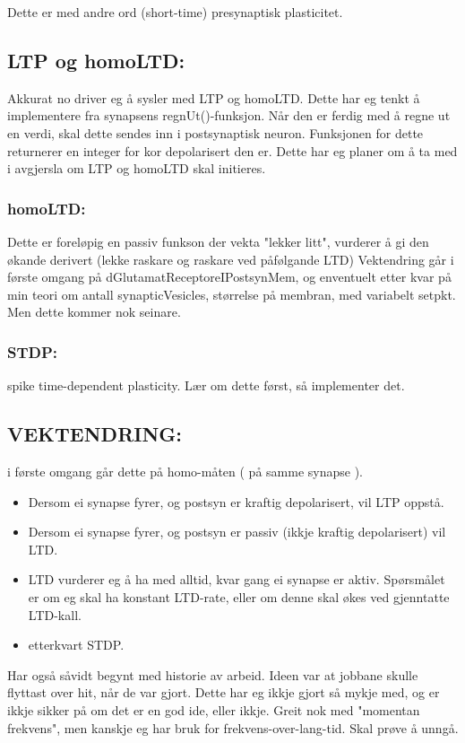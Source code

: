 \documentclass[norsk,9 pt]{report}
\begin{document}
	Dette er med andre ord (short-time) presynaptisk plasticitet.


	\subsection{LTP og homoLTD:}
	Akkurat no driver eg å sysler med LTP og homoLTD. Dette har eg tenkt å implementere fra synapsens regnUt()-funksjon. Når den er ferdig med å regne ut
	en verdi, skal dette sendes inn i postsynaptisk neuron. Funksjonen for dette returnerer en integer for kor depolarisert den er. Dette har eg planer 
	om å ta med i avgjersla om LTP og homoLTD skal initieres. 
		\subsubsection{homoLTD:}
		Dette er foreløpig en passiv funkson der vekta "lekker litt", vurderer å gi den økande derivert (lekke raskare og raskare ved påfølgande LTD)
		Vektendring går i første omgang på dGlutamatReceptoreIPostsynMem, og enventuelt etter kvar på min teori om 
		antall synapticVesicles, størrelse på membran, med variabelt setpkt. Men dette kommer nok seinare.
		\subsubsection{STDP:}
		spike time-dependent plasticity. Lær om dette først, så implementer det.

	\subsection{VEKTENDRING:}
		i første omgang går dette på homo-måten ( på samme synapse ). 
		\begin{itemize}
			\item Dersom ei synapse fyrer, og postsyn er kraftig depolarisert, vil LTP oppstå.
			\item Dersom ei synapse fyrer, og postsyn er passiv (ikkje kraftig depolarisert) vil LTD.
			\item LTD vurderer eg å ha med alltid, kvar gang ei synapse er aktiv. Spørsmålet er om eg skal ha konstant LTD-rate, eller om denne skal
			økes ved gjenntatte LTD-kall.

			\item etterkvart STDP.
		\end{itemize}



Har også såvidt begynt med historie av arbeid. Ideen var at jobbane skulle flyttast over hit, når de var gjort. Dette har eg ikkje gjort så mykje med, og er 
ikkje sikker på om det er en god ide, eller ikkje. Greit nok med "momentan frekvens", men kanskje eg har bruk for frekvens-over-lang-tid. Skal prøve å unngå.
\end{document}
